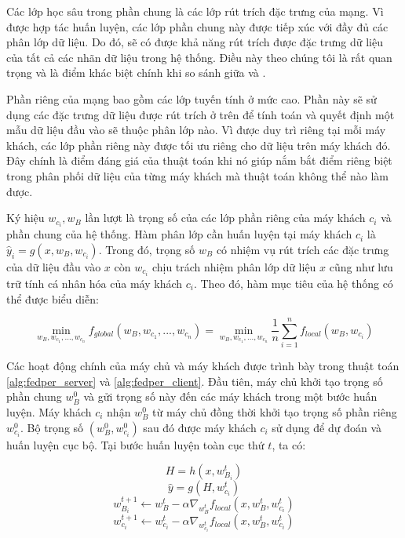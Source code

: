 Các lớp học sâu trong phần chung là các lớp rút trích đặc trưng của mạng. Vì được hợp tác huấn luyện, các lớp phần chung này được tiếp xúc với đầy đủ các phân lớp dữ liệu. Do đó, sẽ có được khả năng rút trích được đặc trưng dữ liệu của tất cả các nhãn dữ liệu trong hệ thống. Điều này theo chúng tôi là rất quan trọng và là điểm khác biệt chính khi so sánh giữa  và .

Phần riêng của mạng bao gồm các lớp tuyến tính ở mức cao. Phần này sẽ sử dụng các đặc trưng dữ liệu được rút trích ở trên để tính toán và quyết định một mẫu dữ liệu đầu vào sẽ thuộc phân lớp nào. Vì được duy trì riêng tại mỗi máy khách, các lớp phần riêng này được tối ưu riêng cho dữ liệu trên máy khách đó. Đây chính là điểm đáng giá của thuật toán  khi nó giúp nắm bắt điểm riêng biệt trong phân phối dữ liệu của từng máy khách mà thuật toán  không thể nào làm được.

Ký hiệu $w_{c_i}, w_B$ lần lượt là trọng số của các lớp phần riêng của máy khách $c_i$ và phần chung của hệ thống. Hàm phân lớp cần huấn luyện tại máy khách $c_i$ là $\hat{y}_i = g(x, w_B, w_{c_i})$. Trong đó, trọng số $w_B$ có nhiệm vụ rút trích các đặc trưng của dữ liệu đầu vào $x$ còn $w_{c_i}$ chịu trách nhiệm phân lớp dữ liệu $x$ cũng như lưu trữ tính cá nhân hóa của máy khách $c_i$. Theo đó, hàm mục tiêu của hệ thống có thể được biểu diễn:

\begin{dmath}
    \min_{w_B, w_{c_1},...,w_{c_n}} f_{global}(w_B, w_{c_1},...,w_{c_n}) = \min_{w_B, w_{c_1},...,w_{c_n}} \frac{1}{n} \sum_{i=1}^n f_{local}(w_B, w_{c_i})
\end{dmath}

Các hoạt động chính của máy chủ và máy khách được trình bày trong thuật toán \ref{alg:fedper_server} và \ref{alg:fedper_client}. Đầu tiên, máy chủ khởi tạo trọng số phần chung $w_B^0$ và gửi trọng số này đến các máy khách trong một bước huấn luyện. Máy khách $c_i$ nhận $w_B^0$ từ máy chủ đồng thời khởi tạo trọng số phần riêng $w_{c_i}^0$. Bộ trọng số $(w_B^0, w_{c_i}^0)$ sau đó được máy khách $c_i$ sử dụng để dự đoán và huấn luyện cục bộ. Tại bước huấn luyện toàn cục thứ $t$, ta có:

\begin{equation}
    H = h(x, w_{B_i}^t)
\end{equation}
\begin{equation}
    \hat{y} = g(H, w_{c_i}^t)
\end{equation}
\begin{equation}
    w_{B_i}^{t+1} \leftarrow w_B^t - \alpha\nabla_{w_B^t} f_{local}(x, w_B^t, w_{c_i}^t)
\end{equation}
\begin{equation}
    w_{c_i}^{t+1} \leftarrow w_{c_i}^t - \alpha\nabla_{w_{c_i}^t} f_{local}(x, w_B^t, w_{c_i}^t)
\end{equation}

